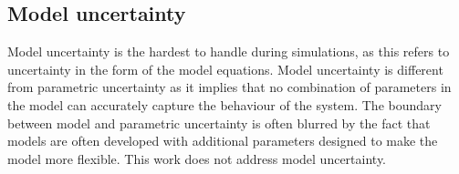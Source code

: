 \subsection{Model uncertainty}
Model uncertainty is the hardest to handle during simulations, as this refers to uncertainty in the form of the model equations.  
Model uncertainty is different from parametric uncertainty as it implies that no combination of parameters in the model can accurately capture the behaviour of the system.  
The boundary between model and parametric uncertainty is often blurred by the fact that models are often developed with additional parameters designed to make the model more flexible.  
This work does not address model uncertainty.

